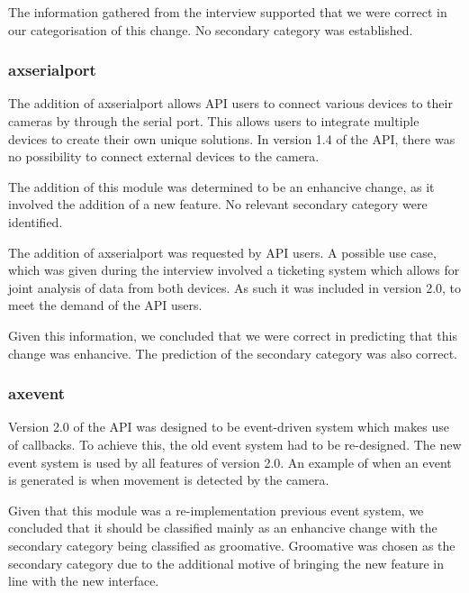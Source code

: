 \documentclass{sig-alternate}
\begin{document}
The information gathered from the interview supported that we were correct in our categorisation of this change. No secondary category was established. 

\subsubsection{axserialport}

The addition of axserialport allows API users to connect various devices to their cameras by through the serial port. This allows users to integrate multiple devices to create their own unique solutions. In version 1.4 of the API, there was no possibility to connect external devices to the camera.

The addition of this module was determined to be an enhancive change, as it involved the addition of a new feature. No relevant secondary category were identified.

The addition of axserialport was requested by API users. A possible use case, which was given during the interview involved a ticketing system which allows for joint analysis of data from both devices. As such it was included in version 2.0, to meet the demand of the API users.

Given this information, we concluded that we were correct in predicting that this change was enhancive. The prediction of the secondary category was also correct. 

\subsubsection{axevent}

Version 2.0 of the API was designed to be event-driven system which makes use of callbacks. To achieve this, the old event system had to be re-designed. The new event system is used by all features of version 2.0. An example of when an event is generated is when movement is detected by the camera. 

Given that this module was a re-implementation previous event system, we concluded that it should be classified mainly as an enhancive change with the secondary category being classified as groomative. Groomative was chosen as the secondary category due to the additional motive of bringing the new feature in line with the new interface.
\end{document}
